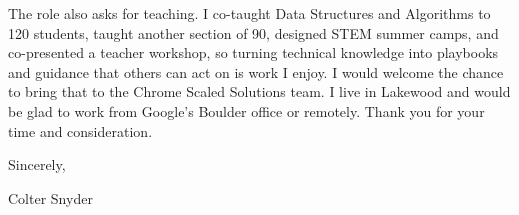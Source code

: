 \documentclass[letterpaper,11pt]{article}
\begin{document}
The role also asks for teaching. I co-taught Data Structures and Algorithms to 120 students, taught
another section of 90, designed STEM summer camps, and co-presented a teacher workshop, so turning
technical knowledge into playbooks and guidance that others can act on is work I enjoy. I would welcome
the chance to bring that to the Chrome Scaled Solutions team. I live in Lakewood and would be glad to work from Google's Boulder office or remotely. Thank you for your time and consideration.

Sincerely,

Colter Snyder
\end{document}

